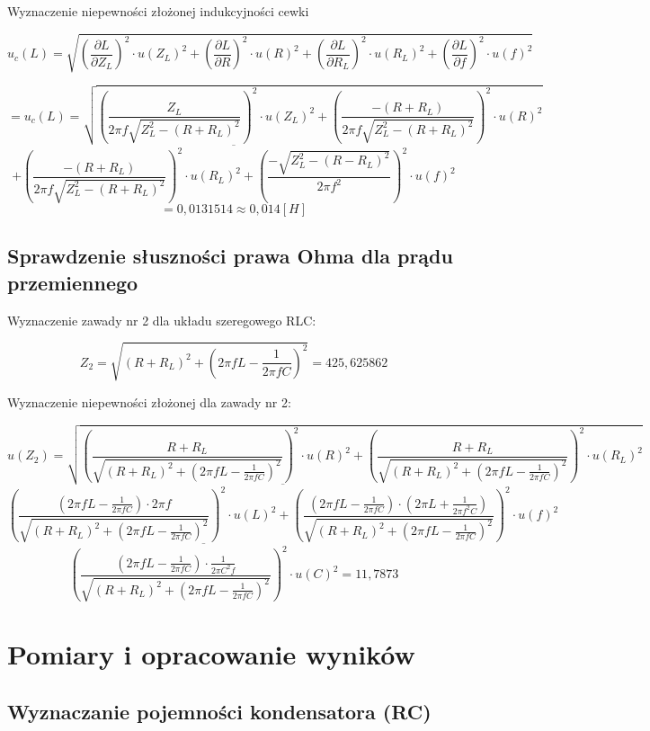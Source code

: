 \documentclass[12pt]{article}
\newcommand{\dpartial}[2]{\frac{\partial #1}{\partial #2}}
\newcommand{\physdpartial}[2]{\left( \dpartial{#1}{#2} \right)^2}
\newcommand{\powfrac}[2]{\left( \frac{#1}{#2} \right)^2}
\begin{document}
Wyznaczenie niepewności złożonej indukcyjności cewki

$$ u_c(L) = \sqrt{ \physdpartial{L}{Z_L} \cdot u(Z_L)^2 + \physdpartial{L}{R} \cdot u(R)^2 + \physdpartial{L}{R_L} \cdot u(R_L)^2 + \physdpartial{L}{f} \cdot u(f)^2 } $$

$$ = u_c(L) = \sqrt{ \powfrac{Z_L}{2\pi f \sqrt{Z_L^2 - (R + R_L)^2}} \cdot u(Z_L)^2 + \powfrac{-(R + R_L)}{2\pi f \sqrt{Z_L^2 - (R + R_L)^2}} \cdot u(R)^2 } $$
$$ \overline{+ \powfrac{-(R + R_L)}{2\pi f \sqrt{Z_L^2 - (R + R_L)^2}} \cdot u(R_L)^2 + \powfrac{- \sqrt{Z_L^2 - (R - R_L)^2}}{2 \pi f^2} \cdot u(f)^2 } $$
$$ = 0,0131514 \approx 0,014[H]$$

\pagebreak

\subsection{Sprawdzenie słuszności prawa Ohma dla prądu przemiennego}

Wyznaczenie zawady nr 2 dla układu szeregowego RLC:

$$ Z_2 = \sqrt{(R + R_L)^2 + \left(2 \pi f L - \frac{1}{2 \pi f C}\right)^2} = 425,625862 $$

Wyznaczenie niepewności złożonej dla zawady nr 2:

$$ u(Z_2) = \sqrt{ \powfrac{R + R_L}{\sqrt{(R + R_L)^2 + \left(2 \pi f L - \frac{1}{2\pi f C}\right)^2}} \cdot u(R)^2 + \powfrac{R+R_L}{\sqrt{(R + R_L)^2 + \left(2 \pi f L - \frac{1}{2\pi f C}\right)^2}} \cdot u(R_L)^2 } $$
$$ \overline{ \powfrac{\left( 2\pi f L - \frac{1}{2 \pi f C} \right) \cdot 2 \pi f}{\sqrt{(R + R_L)^2 + \left(2 \pi f L - \frac{1}{2\pi f C}\right)^2}} \cdot u(L)^2 + 
\powfrac{\left(2 \pi f L - \frac{1}{2 \pi f C}\right) \cdot \left( 2\pi L + \frac{1}{2 \pi f^2 C} \right)}{\sqrt{(R + R_L)^2 + \left(2 \pi f L - \frac{1}{2\pi f C}\right)^2}} \cdot u(f)^2} $$
$$ \overline{ \powfrac{\left( 2 \pi f L - \frac{1}{2 \pi f C} \right) \cdot \frac{1}{2 \pi C^2 f}}{\sqrt{(R + R_L)^2 + \left(2 \pi f L - \frac{1}{2\pi f C}\right)^2}} \cdot u(C)^2 } 
= 11,7873 $$

\pagebreak

\section{Pomiary i opracowanie wyników}

\subsection{Wyznaczanie pojemności kondensatora (RC)}
\end{document}
